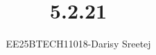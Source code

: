 \documentclass[journal]{IEEEtran}
\begin{document}

\vspace{3cm}

\title{5.2.21}
\author{EE25BTECH11018-Darisy Sreetej}
 \maketitle
{\let\newpage\relax\maketitle}

\renewcommand{\thefigure}{\theenumi}
\renewcommand{\thetable}{\theenumi}
\setlength{\intextsep}{10pt} %


\renewcommand{\thetable}{\theenumi}
\end{document}
